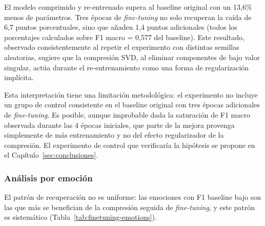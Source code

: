El modelo comprimido y re-entrenado supera al baseline original con un
13{,}6\% menos de parámetros. Tres épocas de \emph{fine-tuning} no solo recuperan
la caída de 6{,}7 puntos porcentuales, sino que añaden 1{,}4 puntos
adicionales (todos los porcentajes calculados sobre F1 macro = 0{,}577 del
baseline). Este resultado, observado consistentemente al repetir el
experimento con distintas semillas aleatorias, sugiere que la compresión
SVD, al eliminar componentes de bajo valor singular, actúa durante el
re-entrenamiento como una forma de regularización implícita.

Esta interpretación tiene una limitación metodológica: el experimento no incluye un grupo de control consistente
en el baseline original con tres épocas adicionales de \emph{fine-tuning}. Es
posible, aunque improbable dada la saturación de F1 macro observada
durante las 4 épocas iniciales, que parte de la mejora provenga
simplemente de más entrenamiento y no del efecto regularizador de la
compresión. El experimento de control que verificaría la hipótesis se propone en el Capítulo~\ref{sec:conclusiones}.


\subsubsection{Análisis por emoción}

El patrón de recuperación no es uniforme: las emociones con F1 baseline
bajo son las que más se benefician de la compresión seguida de
\emph{fine-tuning}, y este patrón es sistemático
(Tabla~\ref{tab:finetuning-emotions}).

